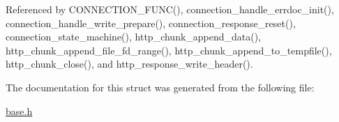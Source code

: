 Referenced by C\-O\-N\-N\-E\-C\-T\-I\-O\-N\-\_\-\-F\-U\-N\-C(), connection\-\_\-handle\-\_\-errdoc\-\_\-init(), connection\-\_\-handle\-\_\-write\-\_\-prepare(), connection\-\_\-response\-\_\-reset(), connection\-\_\-state\-\_\-machine(), http\-\_\-chunk\-\_\-append\-\_\-data(), http\-\_\-chunk\-\_\-append\-\_\-file\-\_\-fd\-\_\-range(), http\-\_\-chunk\-\_\-append\-\_\-to\-\_\-tempfile(), http\-\_\-chunk\-\_\-close(), and http\-\_\-response\-\_\-write\-\_\-header().



The documentation for this struct was generated from the following file\-:\begin{DoxyCompactItemize}
\item 
\hyperlink{base_8h}{base.\-h}\end{DoxyCompactItemize}
